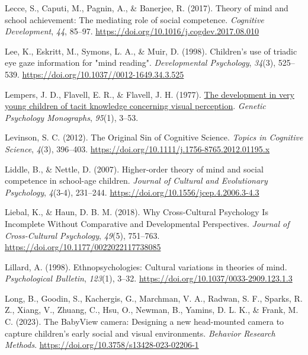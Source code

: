 \documentclass[
]{scrbook}
\newlength{\cslhangindent}
\newenvironment{CSLReferences}[2] %
 {\begin{list}{}{%
  \setlength{\itemindent}{0pt}
  \setlength{\leftmargin}{0pt}
  \setlength{\parsep}{0pt}
  \ifodd #1
   \setlength{\leftmargin}{\cslhangindent}
   \setlength{\itemindent}{-1\cslhangindent}
  \fi
  \setlength{\itemsep}{#2\baselineskip}}}
 {\end{list}}
\begin{document}
\begin{CSLReferences}{1}{0}
Lecce, S., Caputi, M., Pagnin, A., \& Banerjee, R. (2017). Theory of mind and school achievement: {The} mediating role of social competence. \emph{Cognitive Development}, \emph{44}, 85--97. \url{https://doi.org/10.1016/j.cogdev.2017.08.010}

Lee, K., Eskritt, M., Symons, L. A., \& Muir, D. (1998). Children's use of triadic eye gaze information for "mind reading". \emph{Developmental Psychology}, \emph{34}(3), 525--539. \url{https://doi.org/10.1037//0012-1649.34.3.525}

Lempers, J. D., Flavell, E. R., \& Flavell, J. H. (1977). \href{https://www.ncbi.nlm.nih.gov/pubmed/849832}{The development in very young children of tacit knowledge concerning visual perception}. \emph{Genetic Psychology Monographs}, \emph{95}(1), 3--53.

Levinson, S. C. (2012). The {Original Sin} of {Cognitive Science}. \emph{Topics in Cognitive Science}, \emph{4}(3), 396--403. \url{https://doi.org/10.1111/j.1756-8765.2012.01195.x}

Liddle, B., \& Nettle, D. (2007). Higher-order theory of mind and social competence in school-age children. \emph{Journal of Cultural and Evolutionary Psychology}, \emph{4}(3-4), 231--244. \url{https://doi.org/10.1556/jcep.4.2006.3-4.3}

Liebal, K., \& Haun, D. B. M. (2018). Why {Cross-Cultural Psychology Is Incomplete Without Comparative} and {Developmental Perspectives}. \emph{Journal of Cross-Cultural Psychology}, \emph{49}(5), 751--763. \url{https://doi.org/10.1177/0022022117738085}

Lillard, A. (1998). Ethnopsychologies: {Cultural} variations in theories of mind. \emph{Psychological Bulletin}, \emph{123}(1), 3--32. \url{https://doi.org/10.1037/0033-2909.123.1.3}

Long, B., Goodin, S., Kachergis, G., Marchman, V. A., Radwan, S. F., Sparks, R. Z., Xiang, V., Zhuang, C., Hsu, O., Newman, B., Yamins, D. L. K., \& Frank, M. C. (2023). The {BabyView} camera: {Designing} a new head-mounted camera to capture children's early social and visual environments. \emph{Behavior Research Methods}. \url{https://doi.org/10.3758/s13428-023-02206-1}


\end{CSLReferences}
\end{document}
